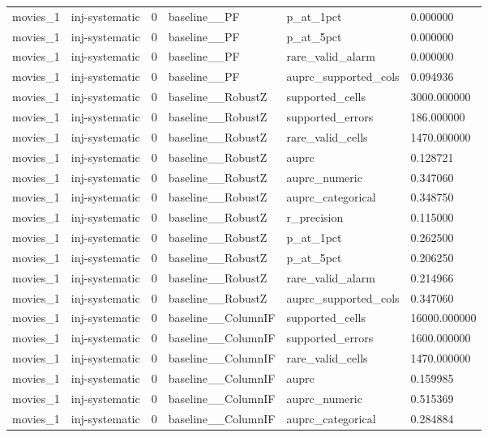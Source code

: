 \begin{tabular}{llllll}
movies\_1 & inj-systematic & 0 & baseline\_\_PF & p\_at\_1pct & 0.000000 \\
movies\_1 & inj-systematic & 0 & baseline\_\_PF & p\_at\_5pct & 0.000000 \\
movies\_1 & inj-systematic & 0 & baseline\_\_PF & rare\_valid\_alarm & 0.000000 \\
movies\_1 & inj-systematic & 0 & baseline\_\_PF & auprc\_supported\_cols & 0.094936 \\
movies\_1 & inj-systematic & 0 & baseline\_\_RobustZ & supported\_cells & 3000.000000 \\
movies\_1 & inj-systematic & 0 & baseline\_\_RobustZ & supported\_errors & 186.000000 \\
movies\_1 & inj-systematic & 0 & baseline\_\_RobustZ & rare\_valid\_cells & 1470.000000 \\
movies\_1 & inj-systematic & 0 & baseline\_\_RobustZ & auprc & 0.128721 \\
movies\_1 & inj-systematic & 0 & baseline\_\_RobustZ & auprc\_numeric & 0.347060 \\
movies\_1 & inj-systematic & 0 & baseline\_\_RobustZ & auprc\_categorical & 0.348750 \\
movies\_1 & inj-systematic & 0 & baseline\_\_RobustZ & r\_precision & 0.115000 \\
movies\_1 & inj-systematic & 0 & baseline\_\_RobustZ & p\_at\_1pct & 0.262500 \\
movies\_1 & inj-systematic & 0 & baseline\_\_RobustZ & p\_at\_5pct & 0.206250 \\
movies\_1 & inj-systematic & 0 & baseline\_\_RobustZ & rare\_valid\_alarm & 0.214966 \\
movies\_1 & inj-systematic & 0 & baseline\_\_RobustZ & auprc\_supported\_cols & 0.347060 \\
movies\_1 & inj-systematic & 0 & baseline\_\_ColumnIF & supported\_cells & 16000.000000 \\
movies\_1 & inj-systematic & 0 & baseline\_\_ColumnIF & supported\_errors & 1600.000000 \\
movies\_1 & inj-systematic & 0 & baseline\_\_ColumnIF & rare\_valid\_cells & 1470.000000 \\
movies\_1 & inj-systematic & 0 & baseline\_\_ColumnIF & auprc & 0.159985 \\
movies\_1 & inj-systematic & 0 & baseline\_\_ColumnIF & auprc\_numeric & 0.515369 \\
movies\_1 & inj-systematic & 0 & baseline\_\_ColumnIF & auprc\_categorical & 0.284884 \\

\end{tabular}

